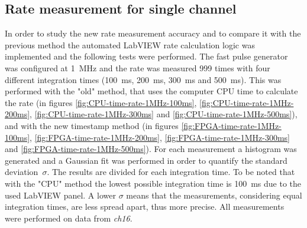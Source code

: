 \subsection{Rate measurement for single channel}\label{RateMeasurements2}
\noindent In order to study the new rate measurement accuracy and to compare it with the previous method the automated LabVIEW rate calculation logic was implemented and the following tests were performed.
The fast pulse generator was configured at 1~MHz and the rate was measured 999 times with four different integration times (100~ms, 200~ms, 300~ms and 500~ms). This was performed with the "old" method, that uses the computer CPU time to calculate the rate (in figures \ref{fig:CPU-time-rate-1MHz-100ms}, \ref{fig:CPU-time-rate-1MHz-200ms}, \ref{fig:CPU-time-rate-1MHz-300ms} and \ref{fig:CPU-time-rate-1MHz-500ms}), and with the new timestamp method (in figures \ref{fig:FPGA-time-rate-1MHz-100ms}, \ref{fig:FPGA-time-rate-1MHz-200ms}, \ref{fig:FPGA-time-rate-1MHz-300ms} and \ref{fig:FPGA-time-rate-1MHz-500ms}).
For each measurement a histogram was generated and a Gaussian fit was performed in order to quantify the standard deviation~$\sigma$. 
The results are divided for each integration time.
To be noted that with the "CPU" method the lowest possible integration time is 100~ms due to the used LabVIEW panel.
A lower $\sigma$ means that the measurements, considering equal integration times, are less spread apart, thus more precise.
All measurements were performed on data from \textit{ch16}.

